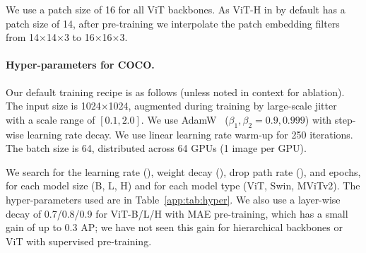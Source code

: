 \documentclass[runningheads]{llncs}
\begin{document}
We use a patch size of 16 for all ViT backbones. As ViT-H in \cite{Dosovitskiy2021} by default has a patch size of 14, after pre-training we interpolate the patch embedding filters from 14$\times$14$\times$3 to 16$\times$16$\times$3. 

\paragraph{Hyper-parameters for COCO.}
Our default training recipe is as follows (unless noted in context for ablation).
The input size is 1024$\times$1024, augmented during training by {large-scale jitter}~\cite{Ghiasi2021} with a scale range of $[0.1, 2.0]$. We use AdamW~\cite{Loshchilov2019} ($\beta_1, \beta_2{=}0.9, 0.999$) with step-wise learning rate decay. We use linear learning rate warm-up \cite{Goyal2017} for 250 iterations. The batch size is 64, distributed across 64 GPUs (1 image per GPU).

We search for the learning rate (\lr), weight decay (\wtd), drop path rate (\drp), and epochs, for each model size (B, L, H) and for each model type (ViT, Swin, MViTv2).
The hyper-parameters used are in Table~\ref{app:tab:hyper}. We also use a layer-wise \lr decay \cite{Bao2021} of 0.7/0.8/0.9 for ViT-B/L/H with MAE pre-training, which has a small gain of up to 0.3 AP; we have not seen this gain for hierarchical backbones or ViT with supervised pre-training.
\end{document}
